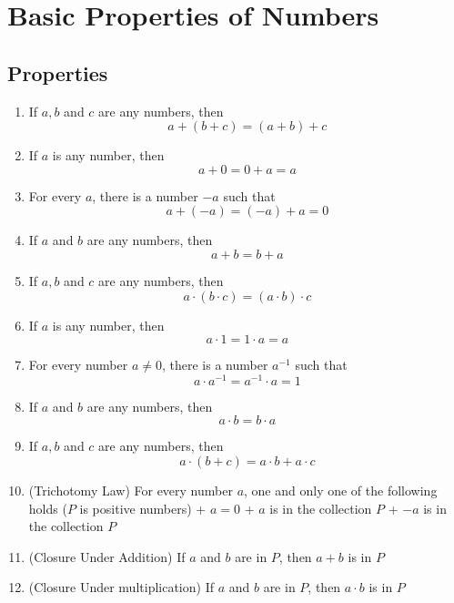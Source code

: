 

\section{Basic Properties of Numbers}
\subsection*{Properties}
\begin{enumerate}

\item If $a, b$ and $c$ are any numbers, then
$$ a + (b + c) = (a + b) + c$$

\item If $a$ is any number, then 
$$ a + 0  = 0 + a = a$$

\item For every $a$, there is a number $-a$ such that
$$a + (-a) = (-a) + a = 0$$

\item If $a$ and $b$ are any numbers, then
$$a + b = b + a$$

\item If $a, b$ and $c$ are any numbers, then
$$a \cdot (b \cdot c) = (a \cdot b ) \cdot c$$

\item If $a$ is any number, then
$$ a \cdot 1 = 1 \cdot a = a$$

\item For every number $a \neq 0$, there is a number $a^{-1}$ such that
$$ a \cdot a^{-1} = a^{-1} \cdot a  = 1$$

\item If $a$ and $b$ are any numbers, then
$$a \cdot b = b \cdot a$$

\item If $a, b$ and $c$ are any numbers, then
$$ a \cdot (b + c) = a \cdot b + a \cdot c$$

\item (Trichotomy Law) For every number $a$, one and only one of the following holds ($P$ is positive numbers)
    + $a = 0$
    + $a$ is in the collection $P$
    + $-a$ is in the collection $P$

\item (Closure Under Addition) If $a$ and $b$ are in $P$, then $a+b$ is in $P$

\item (Closure Under multiplication) If $a$ and $b$ are in $P$, then $a \cdot b$ is in $P$

\end{enumerate}

